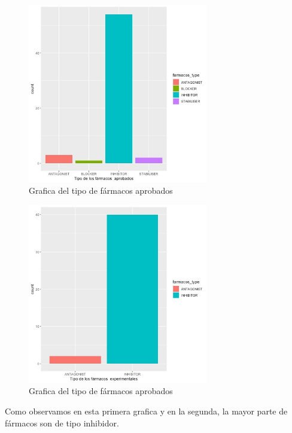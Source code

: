 		\begin{figure}[h!]
			\includegraphics[width=0.7\textwidth]{figures/farmacosaprobados.jpeg}
			\caption{Grafica del tipo de fármacos aprobados}
			\label{fig:cost_megabase}
		\end{figure}
 


		\begin{figure}[h!]
			\includegraphics[width=0.7\textwidth]{figures/farmacosexperimentales.jpeg}
			\caption{Grafica del tipo de fármacos aprobados}
			\label{fig:cost_megabase}
		\end{figure}
Como observamos en esta primera grafica y en la segunda, la mayor parte de fármacos son de tipo inhibidor.

\newpage